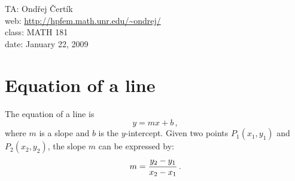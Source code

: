 \documentclass[10pt]{article}
\begin{document}
\noindent TA: Ondřej Čertík\\
web: \url{http://hpfem.math.unr.edu/~ondrej/}\\
class: MATH 181\\
date: January 22, 2009

\section{Equation of a line}

The equation of a line is
$$y=mx+b\,,$$
where $m$ is a slope and $b$ is the $y$-intercept. Given two points $P_1(x_1,
y_1)$ and $P_2(x_2, y_2)$, the slope $m$ can be expressed by:
$$m={y_2-y_1\over x_2-x_1}\,.$$
\end{document}
